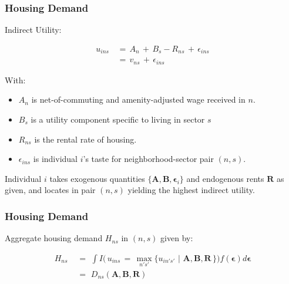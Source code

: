 \documentclass[aspectratio=149]{beamer}
\begin{document}
\begin{frame}
\frametitle{Housing Demand}

Indirect Utility:

\begin{equation*}
\begin{aligned}
u_{ins} \,& =\, A_n\,+\, B_s - R_{ns} \,+\, \epsilon_{ins} \\
        \,& =\, v_{ns} \,+\, \epsilon_{ins}
\end{aligned}
\end{equation*}

With:
\vspace{2mm}
\begin{itemize}
  \item $A_n$ is net-of-commuting and amenity-adjusted wage received in $n$.
  \item $B_s$ is a utility component specific to living in sector $s$
  \item $R_{ns}$ is the rental rate of housing.
  \item $\epsilon_{ins}$ is individual $i$'s taste for neighborhood-sector pair $(n,s)$.
\end{itemize}

\vspace{5mm}

Individual $i$ takes exogenous quantities $\{\bm{A},\bm{B},\bm{\epsilon}_i\}$ and endogenous rents $\bm{R}$ as given, and locates in pair $(n,s)$ yielding the highest indirect utility.


\end{frame}


\begin{frame}
\frametitle{Housing Demand}

Aggregate housing demand $H_{ns}$ in $(n,s)$ given by:

\begin{equation*}
\begin{aligned}
H_{ns} \,\,& =\,\, \int I\Big( \, u_{ins} \,=\, \max_{n's'}\{u_{in' s'} \,\,|\,\, \bm{A},\bm{B},\bm{R}\,\} \Big)f(\bm{\epsilon}) d\bm{\epsilon}    \\[.2em]
        \,\,& =\,\, D_{ns}(\bm{A},\bm{B},\bm{R})
\end{aligned}
\end{equation*}

\end{frame}

\end{document}
